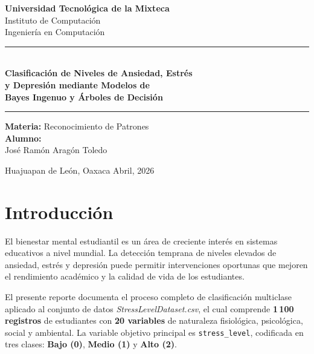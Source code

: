 \documentclass[12pt, letterpaper]{article}
\begin{document}
\begin{titlepage}
    \centering
    \vspace*{1cm}

    {\Large \textbf{Universidad Tecnológica de la Mixteca}}\\[0.3cm]
    {\large Instituto de Computación}\\[0.2cm]
    {\large Ingeniería en Computación}

    \vspace{1.5cm}
    \rule{\linewidth}{0.6pt}\\[0.5cm]
    {\LARGE \textbf{Clasificación de Niveles de Ansiedad, Estrés\\[0.2cm]
    y Depresión mediante Modelos de\\[0.2cm]
    Bayes Ingenuo y Árboles de Decisión}}\\[0.5cm]
    \rule{\linewidth}{0.6pt}

    \vspace{1.5cm}
    {\large \textbf{Materia:} Reconocimiento de Patrones}\\[1cm]

    \vspace{1cm}
    {\large \textbf{Alumno:}}\\[0.4cm]
    {\Large José Ramón Aragón Toledo}

    \vfill
    {\large Huajuapan de León, Oaxaca \hfill Abril, 2026}
\end{titlepage}

\tableofcontents
\newpage

\section{Introducción}

El bienestar mental estudiantil es un área de creciente interés en sistemas
educativos a nivel mundial. La detección temprana de niveles elevados de
ansiedad, estrés y depresión puede permitir intervenciones oportunas que
mejoren el rendimiento académico y la calidad de vida de los estudiantes.

El presente reporte documenta el proceso completo de clasificación multiclase
aplicado al conjunto de datos \textit{StressLevelDataset.csv}, el cual
comprende \textbf{1\,100 registros} de estudiantes con \textbf{20 variables}
de naturaleza fisiológica, psicológica, social y ambiental. La variable
objetivo principal es \texttt{stress\_level}, codificada en tres clases:
\textbf{Bajo (0)}, \textbf{Medio (1)} y \textbf{Alto (2)}.
\end{document}
